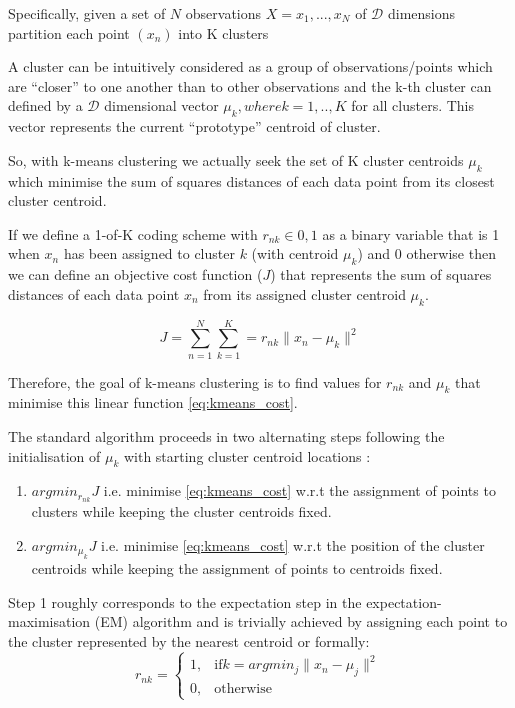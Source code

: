 Specifically, given a set of \(N\) observations \(X = {x_{1},...,x_{N}}\) 
of \(\mathcal{D}\) dimensions partition each point \((x_{n})\) into K clusters

A cluster can be intuitively considered as a group of observations/points which are 
``closer'' to one another than to other observations and the k-th cluster can 
defined by a \(\mathcal{D}\) dimensional vector \(\mu_{k}, where k=1,..,K\) for all clusters.
This vector represents the current ``prototype'' centroid of cluster. 

So, with k-means clustering we actually seek the set of K cluster centroids \({\mu_{k}}\) 
which minimise the sum of squares distances of each data point from its closest cluster centroid.
\citep{Bishop2006}

If we define a 1-of-K coding scheme with \(r_{nk} \in {0,1}\) as a binary variable that is 1 when \(x_{n}\) has been
assigned to cluster \(k\) (with centroid \(\mu_{k}\)) and 0 otherwise then we can define an objective cost function (\(J\)) 
that represents the sum of squares distances of each data point \(x_{n}\) from its assigned cluster centroid \(\mu_{k}\).

\[ 
    J = \sum_{n=1}^{N}\sum_{k=1}^{K} = r_{nk} \|x_{n} - \mu_{k}\|^{2}
    \label{eq:kmeans_cost}
\]

Therefore, the goal of k-means clustering is to find values for \({r_{nk}}\) and \({\mu_{k}}\) that minimise this linear 
function \ref{eq:kmeans_cost}.
\citep{Bishop2006}


The standard algorithm proceeds in two alternating steps following the initialisation of \(\mu_{k}\) with starting
cluster centroid locations \citep{Forgy1965,Lloyd1982}:
\begin{enumerate}
    \item \(argmin_{r_{nk}} J\) i.e. minimise \ref{eq:kmeans_cost} w.r.t the assignment of points to clusters while keeping
        the cluster centroids fixed.
    \item \(argmin_{\mu_{k}} J\) i.e. minimise \ref{eq:kmeans_cost} w.r.t the position of the cluster centroids while keeping
        the assignment of points to centroids fixed.
\end{enumerate}

Step 1 roughly corresponds to the expectation step in the expectation-maximisation (EM) algorithm and is trivially achieved by 
assigning each point to the cluster represented by the nearest centroid or formally:
\[
    r_{nk} = 
    \begin{cases}
        1,& \text{if} k=argmin_{j} \|x_{n} - \mu_{j}\|^{2}\\
        0,& \text{otherwise}
    \end{cases}
\]

